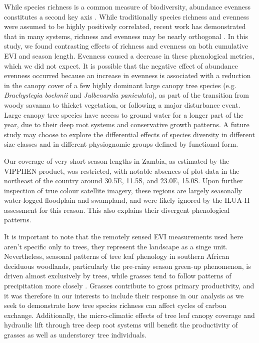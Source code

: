 \documentclass[11pt,a4paper]{article}
\begin{document}
While species richness is a common measure of biodiversity, abundance evenness constitutes a second key axis \citep{Wilsey2005, Hillebrand2008}. While traditionally species richness and evenness were assumed to be highly positively correlated, recent work has demonstrated that in many systems, richness and evenness may be nearly orthogonal \citep{}. In this study, we found contrasting effects of richness and evenness on both cumulative EVI and season length. Evenness caused a decrease in these phenological metrics, which we did not expect. It is possible that the negative effect of abundance evenness occurred because an increase in evenness is associated with a reduction in the canopy cover of a few highly dominant large canopy tree species (e.g. \textit{Brachystegia boehmii} and \textit{Julbenardia paniculata}), as part of the transition from woody savanna to thicket vegetation, or following a major disturbance event. Large canopy tree species have access to ground water for a longer part of the year, due to their deep root systems and conservative growth patterns. A future study may choose to explore the differential effects of species diversity in different size classes and in different physiognomic groups defined by functional form.

Our coverage of very short season lengths in Zambia, as estimated by the VIPPHEN product, was restricted, with notable absences of plot data in the northeast of the country around 30.5\textdegree{}E, 11.5\textdegree{}S, and 23.0\textdegree{}E, 15.0\textdegree{}S. Upon further inspection of true colour satellite imagery, these regions are largely seasonally water-logged floodplain and swampland, and were likely ignored by the ILUA-II assessment for this reason. This also explains their divergent phenological patterns. 

It is important to note that the remotely sensed EVI measurements used here aren't specific only to trees, they represent the landscape as a singe unit. Nevertheless, seasonal patterns of tree leaf phenology in southern African deciduous woodlands, particularly the pre-rainy season green-up phenomenon, is driven almost exclusively by trees, while grasses tend to follow patterns of precipitation more closely \citep{}. Grasses contribute to gross primary productivity, and it was therefore in our interests to include their response in our analysis as we seek to demonstrate how tree species richness can affect cycles of carbon exchange. Additionally, the micro-climatic effects of tree leaf canopy coverage and hydraulic lift through tree deep root systems will benefit the productivity of grasses as well as understorey tree individuals.
\end{document}

